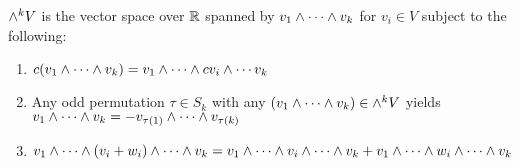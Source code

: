 \documentclass{article}
\begin{document}
    \begin{definition}
        $\wedge^k V$ is the vector space over $\mathbb{R}$ spanned by $v_1 \wedge \cdots \wedge v_k$ for $v_i \in V$ subject to the following:
        \begin{enumerate}
            \item $c(v_1 \wedge \cdots \wedge v_k) = v_1 \wedge \cdots \wedge cv_i \wedge \cdots v_k$
            \item Any odd permutation $\tau \in S_k$ with any $(v_1 \wedge \cdots \wedge v_k) \in \wedge^k V$ yields $v_1 \wedge \cdots \wedge v_k = - v_{\tau(1)} \wedge \cdots \wedge v_{{\tau(k)}}$
            \item $v_1 \wedge \cdots \wedge (v_i + w_i) \wedge \cdots \wedge v_k = v_1 \wedge \cdots \wedge v_i \wedge \cdots \wedge v_k + v_1 \wedge \cdots \wedge w_i \wedge \cdots \wedge v_k$
        \end{enumerate}
    \end{definition}
\end{document}
